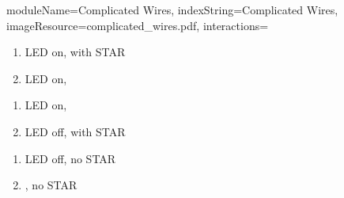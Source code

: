 \documentclass{../../ktane-mod}
\begin{document}
\begin{module}{
  moduleName=Complicated Wires,
  indexString=Complicated Wires,
  imageResource=complicated_wires.pdf,
  interactions=\keysymbol
}
\begin{minipage}[t]{0.48\textwidth}
\begin{enumerate}
  \renewcommand{\labelenumi}{\alph{enumi}.}
  \item LED on,  with STAR
  \item LED on, \RED
\end{enumerate}
\end{minipage}
\hfill
\begin{minipage}[t]{0.48\textwidth}
\begin{enumerate}
  \renewcommand{\labelenumi}{\alph{enumi}.}
  \item LED on, \BLUE
  \item LED off, \PURPLE with STAR
\end{enumerate}

\vspace{0.5cm}

\begin{enumerate}
  \renewcommand{\labelenumi}{\alph{enumi}.}
  \setcounter{enumi}{2}
  \item LED off, no STAR
  \item \PURPLE, no STAR
\end{enumerate}
\end{minipage}

\vspace{1.5cm}

\begin{center}
\large{}
\end{center}


\end{module}
\end{document}

